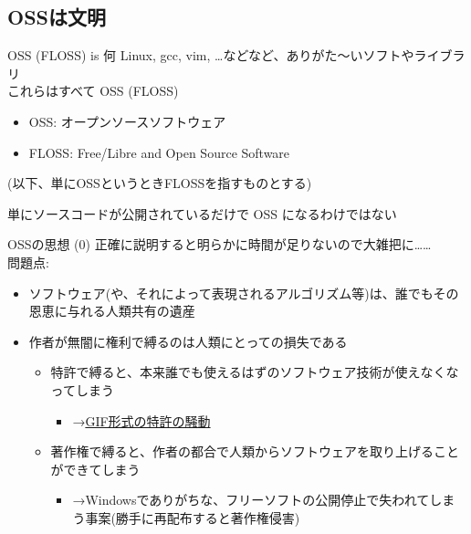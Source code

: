 \documentclass[
        unicode%
    ]{beamer}
\begin{document}
\subsection{OSSは文明}

\begin{frame}{OSS (FLOSS) is 何}
    Linux, gcc, vim, \ldots などなど、ありがた〜いソフトやライブラリ \\
    これらはすべて \alert{OSS} (FLOSS)

    \begin{itemize}
        \item OSS: オープンソースソフトウェア
        \item FLOSS: Free/Libre and Open Source Software
    \end{itemize}

    {\small (以下、単にOSSというときFLOSSを指すものとする)}
    \vspace{\baselineskip}

    単にソースコードが公開されているだけで OSS になるわけではない
\end{frame}

\begin{frame}{OSSの思想 (0)}
    正確に説明すると明らかに時間が足りないので大雑把に……\\

    問題点:

    \begin{itemize}
        \pause
        \item ソフトウェア(や、それによって表現されるアルゴリズム等)は、誰でもその恩恵に与れる人類共有の遺産
        \pause
        \item 作者が無闇に権利で縛るのは人類にとっての損失である
            \begin{itemize}
                \pause
                \item 特許で縛ると、本来誰でも使えるはずのソフトウェア技術が使えなくなってしまう
                    \begin{itemize}
                        \item →\href{https://ja.wikipedia.org/wiki/Graphics_Interchange_Format\#.E7.89.B9.E8.A8.B1.E5.95.8F.E9.A1.8C.E3.81.A8.E3.81.9D.E3.81.AE.E9.A1.9B.E6.9C.AB}{GIF形式の特許の騒動}
                    \end{itemize}
                \pause
                \item 著作権で縛ると、作者の都合で人類からソフトウェアを取り上げることができてしまう
                    \begin{itemize}
                        \item →Windowsでありがちな、フリーソフトの公開停止で失われてしまう事案(勝手に再配布すると著作権侵害)
                    \end{itemize}
            \end{itemize}
    \end{itemize}
\end{frame}
\end{document}
